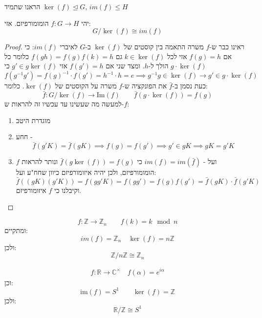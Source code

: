 \documentclass{tstextbook}
\begin{document}
\begin{reminder}
הראנו שתמיד \(\ker(f) \trianglelefteq G\), \(im(f)\leq H\)

\end{reminder}
\begin{theorem}
יהי \(f:G\to H\) הומומורפיזם. אזי: 
$$G/\ker(f) \cong im(f)$$

\end{theorem}
\begin{proof}
ראינו כבר ש-\(f\) משרה התאמה בין קוסטים של \(\ker(f)\) ב-\(G\) לאיברי \(im(f)\):
כי אם \(f(g)=h\) אזי לכל \(k\in \ker(f)\) גם \(f(gh)=f(g)f(k)=h\) כלומר כל \(g\cdot \ker(f)\) הולך ל-\(h\). ומצד שני אם \(f(g')=h\) אזי \(g'\in g\ker(f)\) כי 
$$f(g^{-1} g')=f(g)^{-1} \cdot f(g')=h^{-1} \cdot h=e\implies g^{-1} g\in \ker(f)\to g'\in g\cdot \ker(f)$$
כעת נסמן ב-\(\bar{f}\) את הפונקציה ש-\(f\) משרה על הקוסטים של \(\ker(f)\). כלומר:
$$\bar{f}:G/\ker(f)\to \mathrm{Im}(f) \qquad \bar{f}\left( g\cdot \ker(f)  \right)=f(g)$$
למעשה מה שעשינו עד עכשיו זה להראות ש-\(f\):

  \begin{enumerate}
    \item מוגדרת היטב 


    \item חחע - 
$$\bar{f}(g'K)=\bar{f}(gK)\implies f(g)=f(g')\implies g'\in gK\implies gK=g'K$$


    \item ועל - \(im(f)=im\left( \bar{f} \right)\) כי \(\bar{f}\left( g\ker(f)  \right)=f(g)\) ונותר להראות \(f\) הומומורפיזם, ולכן יהיה איזומורפיזם כיוון שחח"ע ועל: 
$$\bar{f}((gK)(g'K))= f(gg'K)=f(gg')=f(g)f(g')=  \bar{f}(gK)\cdot \bar{f}(g'K)$$
וקיבלנו כי \(f\) איזומורפיזם.


  \end{enumerate}
\end{proof}
\begin{example}
$$f:\mathbb{Z} \to \mathbb{Z} _{n} \qquad f(k)=k\mod n$$
ומתקיים:
$$im(f)=\mathbb{Z} _{n}\quad \ker(f)=n\mathbb{Z}$$
ולכן:
$$\mathbb{Z} / n\mathbb{Z}  \cong \mathbb{Z} _{n}$$

\end{example}
\begin{example}
$$\begin{gathered}f:\mathbb{R} \to \mathbb{C} ^\times \quad f\left( \alpha \right)=e^{i\alpha}
\end{gathered}$$
וכן: 
$$\mathrm{ im }(f)=S^1\qquad \ker(f)=\mathbb{Z}$$
ולכן:
$$\mathbb{R} / \mathbb{Z}  \cong S^1$$

\end{example}
\end{document}

